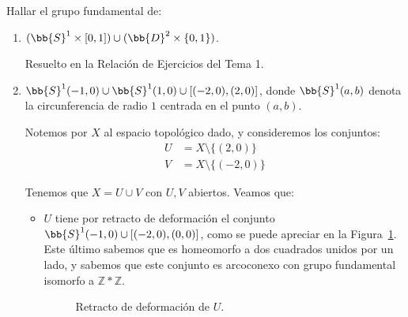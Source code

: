 \documentclass[12pt]{article}
\begin{document}
    \begin{ejercicio}
        Hallar el grupo fundamental de:
        \begin{enumerate}
            \item $(\bb{S}^1\times [0,1])\cup (\bb{D}^2\times \{0,1\})$.
            
            Resuelto en la Relación de Ejercicios del Tema 1.
            \item $\bb{S}^1(-1,0)\cup \bb{S}^1(1,0)\cup [(-2,0),(2,0)]$, donde $\bb{S}^1(a,b)$ denota la circunferencia de radio $1$ centrada en el punto $(a,b)$.
            
            Notemos por $X$ al espacio topológico dado, y consideremos los conjuntos:
            \begin{align*}
                U &= X\setminus \{(2,0)\} \\
                V &= X\setminus \{(-2,0)\}
            \end{align*}
            
            Tenemos que $X=U\cup V$ con $U,V$ abiertos. Veamos que:
            \begin{itemize}
                \item $U$ tiene por retracto de deformación el conjunto $\bb{S}^1(-1,0)\cup [(-2,0),(0,0)]$, como se puede apreciar en la Figura~\ref{fig:retracto_U}. Este último sabemos que es homeomorfo a dos cuadrados unidos por un lado, y sabemos que este conjunto es arcoconexo con grupo fundamental isomorfo a $\mathbb{Z}\ast \mathbb{Z}$.
                \begin{figure}[ht]
                    \centering
                    \caption{Retracto de deformación de $U$.}
                    \label{fig:retracto_U}
                \end{figure}


\end{itemize}
\end{enumerate}
\end{ejercicio}
\end{document}
